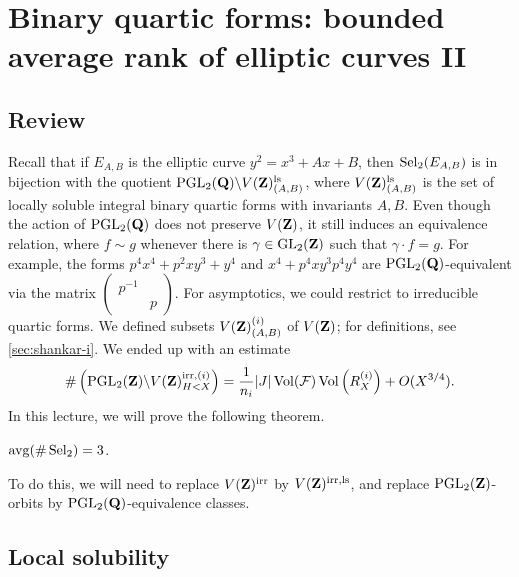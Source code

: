 
\section{Binary quartic forms: bounded average rank of elliptic curves II}\label{sec:shankar-ii}





\subsection{Review}

Recall that if $E_{A,B}$ is the elliptic curve $y^2=x^3+A x+B$, then 
$\operatorname{Sel}_2(E_{A,B})$ is in bijection with the quotient 
$\operatorname{PGL}_2(\mathbf{Q})\backslash V(\mathbf{Z})_{(A,B)}^\mathrm{ls}$, where 
$V(\mathbf{Z})_{(A,B)}^\mathrm{ls}$ is the set of locally soluble integral binary 
quartic forms with invariants $A,B$. Even though the action of 
$\operatorname{PGL}_2(\mathbf{Q})$ does not preserve 
$V(\mathbf{Z})$, it still induces an equivalence relation, where $f\sim g$ whenever 
there is $\gamma\in \operatorname{GL}_2(\mathbf{Z})$ such that $\gamma \cdot f = g$. 
For example, the forms $p^4 x^4 + p^2 x y^3 + y^4$ and 
$x^4 + p^4 x y^3 p^4 y^4$ are $\operatorname{PGL}_2(\mathbf{Q})$-equivalent via 
the matrix $\begin{pmatrix} p^{-1} \\ & p \end{pmatrix}$. For asymptotics, we 
could restrict to irreducible quartic forms. We defined subsets 
$V(\mathbf{Z})_{(A,B)}^{(i)}$ of $V(\mathbf{Z})$; for definitions, see 
\autoref{sec:shankar-i}. We ended up with an estimate 
\[
  \#\left(\operatorname{PGL}_2(\mathbf{Z})\backslash V(\mathbf{Z})_{H<X}^{\mathrm{irr},(i)}\right) = \frac{1}{n_i} |J| \operatorname{Vol}(\mathcal{F}) \operatorname{Vol}\left(R_X^{(i)}\right) + O(X^{3/4}) .
\]
In this lecture, we will prove the following theorem. 

\begin{theo}
$\operatorname{avg}(\#\operatorname{Sel}_2) = 3$. 
\end{theo}

To do this, we will need to replace $V(\mathbf{Z})^\mathrm{irr}$ by 
$V(\mathbf{Z})^{\mathrm{irr},\mathrm{ls}}$, and replace 
$\operatorname{PGL}_2(\mathbf{Z})$-orbits by 
$\operatorname{PGL}_2(\mathbf{Q})$-equivalence classes. 





\subsection{Local solubility}

